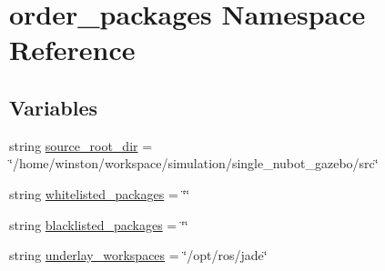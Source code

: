 \hypertarget{namespaceorder__packages}{\section{order\-\_\-packages Namespace Reference}
\label{namespaceorder__packages}
}
\subsection*{Variables}
\begin{DoxyCompactItemize}
\item 
string \hyperlink{namespaceorder__packages_aff4fd297841de7fbddc2c0c33a6bab21}{source\-\_\-root\-\_\-dir} = \char`\"{}/home/winston/workspace/simulation/single\-\_\-nubot\-\_\-gazebo/src\char`\"{}
\item 
string \hyperlink{namespaceorder__packages_a84450a73e77dbf3689293b97dcb697a4}{whitelisted\-\_\-packages} = \char`\"{}\char`\"{}
\item 
string \hyperlink{namespaceorder__packages_a29ea913f00c5a0e81d3c7688e7375507}{blacklisted\-\_\-packages} = \char`\"{}\char`\"{}
\item 
string \hyperlink{namespaceorder__packages_a11d102ff09fd2977b9075c4c722015d2}{underlay\-\_\-workspaces} = \char`\"{}/opt/ros/jade\char`\"{}
\end{DoxyCompactItemize}


